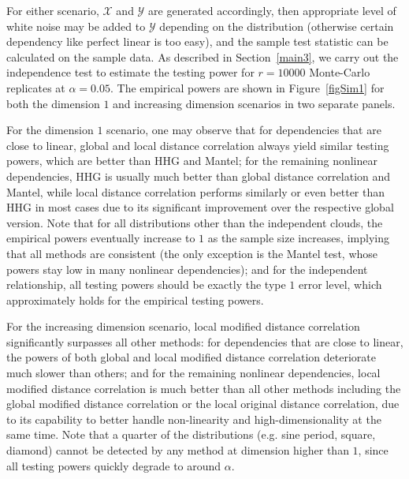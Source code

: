 \documentclass[12pt]{article}
\begin{document}
For either scenario, $\mathcal{X}$ and $\mathcal{Y}$ are generated accordingly, then appropriate level of white noise may be added to $\mathcal{Y}$ depending on the distribution (otherwise certain dependency like perfect linear is too easy), and the sample test statistic can be calculated on the sample data. As described in Section~\ref{main3}, we carry out the independence test to estimate the testing power for $r=10000$ Monte-Carlo replicates at $\alpha=0.05$. The empirical powers are shown in Figure~\ref{figSim1} for both the dimension $1$ and increasing dimension scenarios in two separate panels. 

For the dimension $1$ scenario, one may observe that for dependencies that are close to linear, global and local distance correlation always yield similar testing powers, which are better than HHG and Mantel; for the remaining nonlinear dependencies, HHG is usually much better than global distance correlation and Mantel, while local distance correlation performs similarly or even better than HHG in most cases due to its significant improvement over the respective global version. Note that for all distributions other than the independent clouds, the empirical powers eventually increase to $1$ as the sample size increases, implying that all methods are consistent (the only exception is the Mantel test, whose powers stay low in many nonlinear dependencies); and for the independent relationship, all testing powers should be exactly the type $1$ error level, which approximately holds for the empirical testing powers. 

For the increasing dimension scenario, local modified distance correlation significantly surpasses all other methods: for dependencies that are close to linear, the powers of both global and local modified distance correlation deteriorate much slower than others; and for the remaining nonlinear dependencies, local modified distance correlation is much better than all other methods including the global modified distance correlation or the local original distance correlation, due to its capability to better handle non-linearity and high-dimensionality at the same time. Note that a quarter of the distributions (e.g. sine period, square, diamond) cannot be detected by any method at dimension higher than $1$, since all testing powers quickly degrade to around $\alpha$.
\end{document}
